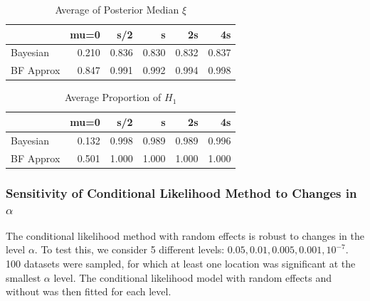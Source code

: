 \documentclass[AMA,STIX1COL]{WileyNJD-v2}\usepackage[]{graphicx}\usepackage[]{color}
\newenvironment{knitrout}{}{} %
\begin{document}
\begin{knitrout}
\color{fgcolor}\begin{table}

\caption{\label{tab:unnamed-chunk-30}Average of Posterior Median $\xi$}
\centering
\begin{tabular}[t]{l|r|r|r|r|r}
\hline
  & mu=0 & s/2 & s & 2s & 4s\\
\hline
Bayesian & 0.210 & 0.836 & 0.830 & 0.832 & 0.837\\
\hline
BF Approx & 0.847 & 0.991 & 0.992 & 0.994 & 0.998\\
\hline
\end{tabular}
\end{table}


\end{knitrout}

\begin{knitrout}
\color{fgcolor}\begin{table}

\caption{\label{tab:unnamed-chunk-31}Average Proportion of $H_1$}
\centering
\begin{tabular}[t]{l|r|r|r|r|r}
\hline
  & mu=0 & s/2 & s & 2s & 4s\\
\hline
Bayesian & 0.132 & 0.998 & 0.989 & 0.989 & 0.996\\
\hline
BF Approx & 0.501 & 1.000 & 1.000 & 1.000 & 1.000\\
\hline
\end{tabular}
\end{table}


\end{knitrout}


\subsubsection{Sensitivity of Conditional Likelihood Method to Changes in $\alpha$}

The conditional likelihood method with random effects is robust to changes in the level $\alpha$. To test this, we consider 5 different levels: $0.05, 0.01, 0.005, 0.001, 10^{-7}$. 100 datasets were sampled, for which at least one location was significant at the smallest $\alpha$ level. The conditional likelihood model with random effects and without was then fitted for each level. 
\end{document}
